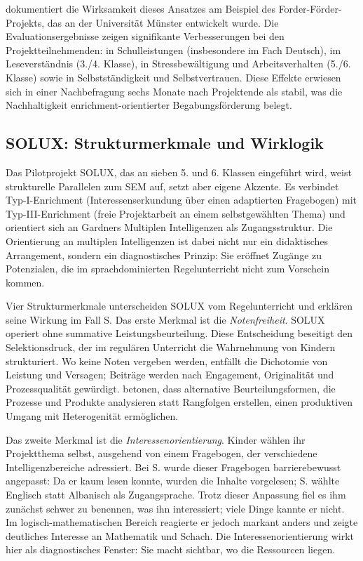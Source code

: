 \documentclass[ngerman, a4paper]{article}
\begin{document}
\textcite{fischer2020begabungsfoerderung} dokumentiert die Wirksamkeit dieses Ansatzes am Beispiel des
Forder-Förder-Projekts, das an der Universität Münster entwickelt wurde. Die
Evaluationsergebnisse zeigen signifikante Verbesserungen bei den
Projektteilnehmenden: in Schulleistungen (insbesondere im Fach Deutsch), im
Leseverständnis (3./4. Klasse), in Stressbewältigung und Arbeitsverhalten
(5./6. Klasse) sowie in Selbstständigkeit und Selbstvertrauen. Diese Effekte
erwiesen sich in einer Nachbefragung sechs Monate nach Projektende als stabil,
was die Nachhaltigkeit enrichment-orientierter Begabungsförderung belegt.

\subsection{SOLUX: Strukturmerkmale und Wirklogik}

Das Pilotprojekt SOLUX, das an sieben 5. und 6. Klassen eingeführt wird, weist
strukturelle Parallelen zum SEM auf, setzt aber eigene Akzente. Es verbindet
Typ-I-Enrichment (Interessenserkundung über einen adaptierten Fragebogen) mit
Typ-III-Enrichment (freie Projektarbeit an einem selbstgewählten Thema) und orientiert
sich an Gardners Multiplen Intelligenzen als Zugangsstruktur. Die Orientierung an
multiplen Intelligenzen ist dabei nicht nur ein didaktisches Arrangement, sondern ein
diagnostisches Prinzip: Sie eröffnet Zugänge zu Potenzialen, die im sprachdominierten
Regelunterricht nicht zum Vorschein kommen.

Vier Strukturmerkmale unterscheiden SOLUX vom Regelunterricht und erklären seine
Wirkung im Fall S. Das erste Merkmal ist die \textit{Notenfreiheit}. SOLUX operiert
ohne summative Leistungsbeurteilung. Diese Entscheidung beseitigt den
Selektionsdruck, der im regulären Unterricht die Wahrnehmung von Kindern strukturiert.
Wo keine Noten vergeben werden, entfällt die Dichotomie von Leistung und Versagen;
Beiträge werden nach Engagement, Originalität und Prozessqualität gewürdigt.
\textcite{buholzer2010allegleich} betonen, dass alternative Beurteilungsformen, die Prozesse
und Produkte analysieren statt Rangfolgen erstellen, einen produktiven Umgang mit
Heterogenität ermöglichen.

Das zweite Merkmal ist die \textit{Interessenorientierung}. Kinder wählen ihr
Projektthema selbst, ausgehend von einem Fragebogen, der verschiedene
Intelligenzbereiche adressiert. Bei S. wurde dieser Fragebogen barrierebewusst
angepasst: Da er kaum lesen konnte, wurden die Inhalte vorgelesen; S. wählte
Englisch statt Albanisch als Zugangsprache. Trotz dieser Anpassung fiel es ihm
zunächst schwer zu benennen, was ihn interessiert; viele Dinge kannte er nicht.
Im logisch-mathematischen Bereich reagierte er jedoch markant anders und zeigte
deutliches Interesse an Mathematik und Schach. Die Interessenorientierung wirkt
hier als diagnostisches Fenster: Sie macht sichtbar, wo die Ressourcen liegen.
\end{document}
